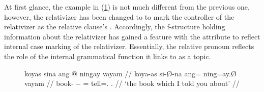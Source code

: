 At first glance, the example in (\ref{ex:relc_siintcase}) is not much different
from the previous one, however, the relativizer has been changed to
 to mark the controller of the relativizer as
the relative clause's . Accordingly, the f-structure holding
information about the relativizer has gained a \Case{} feature with the
attribute \Gen{} to reflect internal case marking of the relativizer.
Essentially, the relative pronoun reflects the role of the internal grammatical
function it links to as a topic.

\begin{figure}
\ex\label{ex:relc_siintcase}
\begin{minipage}[t]{.5\remaining}
\begingl
	\gla koyās sinā ang @ ningay vayam //
	\glb koya-as si-Ø-na ang= ning=ay.Ø vayam //
	\glc book-\Parg{} \Rel{}-\Parg{}-\Gen{} \AgtT{}= tell=\Fsg{}.\Top{} 
		\Second{}.\Dat{} //
	\glft `the book which I told you about' //
\endgl
\medskip
\vspace{2.5em}
\end{minipage}
\end{figure}
